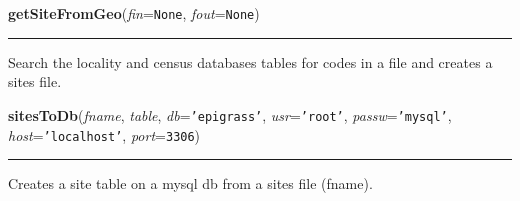     \label{Epigrass:data_io:getSiteFromGeo}

    \vspace{0.5ex}

    \begin{boxedminipage}{\textwidth}

    \raggedright \textbf{getSiteFromGeo}(\textit{fin}=\texttt{None}, \textit{fout}=\texttt{None})

    \vspace{-1.5ex}

    \rule{\textwidth}{0.5\fboxrule}
    Search the locality and census databases tables for codes in a file and
    creates a sites file.

    \vspace{1ex}

    \end{boxedminipage}

    \label{Epigrass:data_io:sitesToDb}

    \vspace{0.5ex}

    \begin{boxedminipage}{\textwidth}

    \raggedright \textbf{sitesToDb}(\textit{fname}, \textit{table}, \textit{db}=\texttt{'epigrass'}, \textit{usr}=\texttt{'root'}, \textit{passw}=\texttt{'mysql'}, \textit{host}=\texttt{'localhost'}, \textit{port}=\texttt{3306})

    \vspace{-1.5ex}

    \rule{\textwidth}{0.5\fboxrule}
    Creates a site table on a mysql db from a sites file (fname).

    \vspace{1ex}

    \end{boxedminipage}


